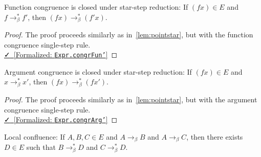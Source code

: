 \documentclass{lmcs}
\newcommand{\leanlink}[2]{
  \href{#1}{\textcolor{black}\faCheck~[Formalized: \texttt{#2}]}%
}
\newcommand{\arr}{\rightarrow}
\newcommand{\barr}{\arr_{\beta}}
\begin{document}
\begin{lem}\label{lem:congrfunstar}
  Function congruence is closed under star-step reduction: If \((f x) \in E\) and \(f \barr^{*} f'\), then \((f x) \barr^{*} (f' x)\).
\end{lem}

\begin{proof}
  The proof proceeds similarly as in~\ref{lem:pointstar}, but with the function congruence single-step rule.\\
  \noindent \leanlink{https://github.com/lexzaiello/DCC/blob/fb7acf6d9644df7d13c809d12609b59eaca5c763/Dcc/Red/Run.lean\#L232}{Expr.congrFun'}
\end{proof}

\begin{lem}\label{lem:congrargstar}
  Argument congruence is closed under star-step reduction: If \((f x) \in E\) and \(x \barr^{*} x'\), then \((f x) \barr^{*} (f x')\).
\end{lem}

\begin{proof}
  The proof proceeds similarly as in~\ref{lem:pointstar}, but with the argument congruence single-step rule.\\
  \noindent \leanlink{https://github.com/lexzaiello/DCC/blob/fb7acf6d9644df7d13c809d12609b59eaca5c763/Dcc/Red/Run.lean\#L262}{Expr.congrArg'}
\end{proof}

\begin{thm}\label{thm:conflocal}
  Local confluence: If \(A, B, C \in E\) and \(A \barr B\) and \(A \barr C\), then there exists \(D \in E\) such that \(B \barr^{*} D\) and \(C \barr^{*} D\).
\end{thm}
\end{document}
